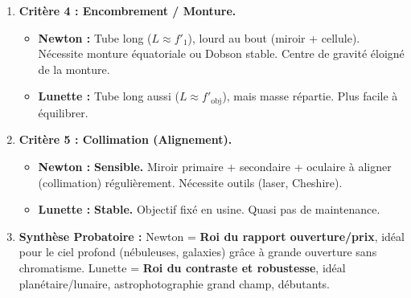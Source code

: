 \documentclass[11pt]{article}
\begin{document}
\begin{methode}
\begin{enumerate}
    \item \textbf{Critère 4 : Encombrement / Monture.}
    \begin{itemize}
        \item \textbf{Newton :} Tube long ($L \approx f'_1$), lourd au bout (miroir + cellule). Nécessite monture équatoriale ou Dobson stable. Centre de gravité éloigné de la monture.
        \item \textbf{Lunette :} Tube long aussi ($L \approx f'_{\text{obj}}$), mais masse répartie. Plus facile à équilibrer.
    \end{itemize}
    \item \textbf{Critère 5 : Collimation (Alignement).}
    \begin{itemize}
        \item \textbf{Newton :} \textbf{Sensible.} Miroir primaire + secondaire + oculaire à aligner (collimation) régulièrement. Nécessite outils (laser, Cheshire).
        \item \textbf{Lunette :} \textbf{Stable.} Objectif fixé en usine. Quasi pas de maintenance.
    \end{itemize}
    \item \textbf{Synthèse Probatoire :} Newton = \textbf{Roi du rapport ouverture/prix}, idéal pour le ciel profond (nébuleuses, galaxies) grâce à grande ouverture sans chromatisme. Lunette = \textbf{Roi du contraste et robustesse}, idéal planétaire/lunaire, astrophotographie grand champ, débutants.
\end{enumerate}
\end{methode}
\end{document}
